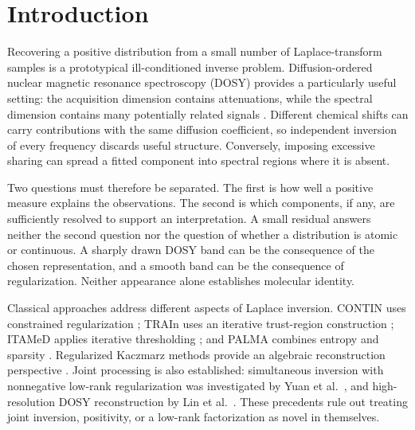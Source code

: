 \section{Introduction}
Recovering a positive distribution from a small number of Laplace-transform samples is a prototypical ill-conditioned inverse problem. Diffusion-ordered nuclear magnetic resonance spectroscopy (DOSY) provides a particularly useful setting: the acquisition dimension contains attenuations, while the spectral dimension contains many potentially related signals \cite{stejskal,morris}. Different chemical shifts can carry contributions with the same diffusion coefficient, so independent inversion of every frequency discards useful structure. Conversely, imposing excessive sharing can spread a fitted component into spectral regions where it is absent.

Two questions must therefore be separated. The first is how well a positive measure explains the observations. The second is which components, if any, are sufficiently resolved to support an interpretation. A small residual answers neither the second question nor the question of whether a distribution is atomic or continuous. A sharply drawn DOSY band can be the consequence of the chosen representation, and a smooth band can be the consequence of regularization. Neither appearance alone establishes molecular identity.

Classical approaches address different aspects of Laplace inversion. CONTIN uses constrained regularization \cite{contin}; TRAIn uses an iterative trust-region construction \cite{train}; ITAMeD applies iterative thresholding \cite{itamed}; and PALMA combines entropy and sparsity \cite{palma}. Regularized Kaczmarz methods provide an algebraic reconstruction perspective \cite{kaczmarz}. Joint processing is also established: simultaneous inversion with nonnegative low-rank regularization was investigated by Yuan et al.\ \cite{silt}, and high-resolution DOSY reconstruction by Lin et al.\ \cite{lin}. These precedents rule out treating joint inversion, positivity, or a low-rank factorization as novel in themselves.

